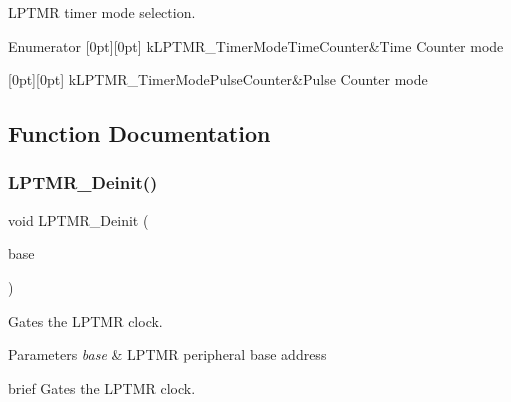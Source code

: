 L\+P\+T\+MR timer mode selection. 

\begin{DoxyEnumFields}{Enumerator}
[0pt][0pt]{}\mbox{\label{group__lptmr_gga40237256921d8a780c71b2f4ce162498a308f1e902c37f04845e88dbdcf090d1d}} 
k\+L\+P\+T\+M\+R\+\_\+\+Timer\+Mode\+Time\+Counter&Time Counter mode \\
\hline

[0pt][0pt]{}\mbox{\label{group__lptmr_gga40237256921d8a780c71b2f4ce162498a3e671df6c6027b048c5878d45031415d}} 
k\+L\+P\+T\+M\+R\+\_\+\+Timer\+Mode\+Pulse\+Counter&Pulse Counter mode \\
\hline

\end{DoxyEnumFields}


\subsection{Function Documentation}
\mbox{\label{group__lptmr_ga2436bf246a0aab4a0191d059b80ff088}} 
\subsubsection{\texorpdfstring{LPTMR\_Deinit()}{LPTMR\_Deinit()}}
{\footnotesize\ttfamily void L\+P\+T\+M\+R\+\_\+\+Deinit (\begin{DoxyParamCaption}\item[{\mbox{\hyperlink{struct_l_p_t_m_r___type}{L\+P\+T\+M\+R\+\_\+\+Type}} $\ast$}]{base }\end{DoxyParamCaption})}



Gates the L\+P\+T\+MR clock. 


\begin{DoxyParams}{Parameters}
{\em base} & L\+P\+T\+MR peripheral base address\\
\hline
\end{DoxyParams}
brief Gates the L\+P\+T\+MR clock.

